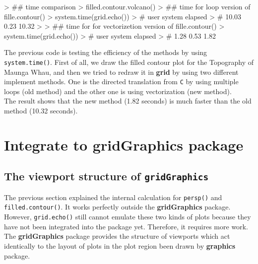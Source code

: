\documentclass[11pt,twoside]{report}
\begin{document}
\begin{Schunk}
\begin{Sinput}
> ## time comparison
> filled.contour.volcano()
> ## time for loop version of fille.contour()
> system.time(grid.echo())
> # user  system elapsed 
> # 10.03    0.23   10.32 
> 
> ## time for for vectorizetion version of fille.contour()
> system.time(grid.echo())
> # user  system elapsed 
> # 1.28    0.53    1.82 
\end{Sinput}
\end{Schunk}


The previous code is testing the efficiency of the methods by using \texttt{system.time()}. First of all, we draw the filled contour plot for the Topography of Maunga Whau, and then we tried to redraw it in \textbf{grid} by using two different implement methods. One is the directed translation from \texttt{C} by using multiple loops (old method) and the other one is using vectorization (new method).\\
The result shows that the new method (1.82 seconds) is much faster than the old method (10.32 seconds).

\chapter{Integrate to \textbf{gridGraphics} package}
\section{The viewport structure of \texttt{gridGraphics}}
The previous section explained the internal calculation for \texttt{persp()} and \texttt{filled.contour()}. It works perfectly outside the \textbf{gridGraphics} package. However, \texttt{grid.echo()} still cannot emulate these two kinds of plots because they have not been integrated into the package yet. Therefore, it requires more work.\\ 

The \textbf{gridGraphics} package provides the structure of viewports which act identically to the layout of plots in the plot region been drawn by \textbf{graphics} package. \\
\end{document}
